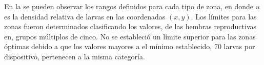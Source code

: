 En la  se pueden observar los rangos definidos para cada tipo de
zona, en donde $u$ es la densidad relativa de larvas en las coordenadas $(x, y)$. Los límites para
las zonas fueron determinados clasificando los valores, de las hembras reproductivas en, grupos
múltiplos de cinco. No se estableció un límite superior para las zonas óptimas debido a que los
valores mayores a el mínimo establecido, 70 larvas por dispositivo, pertenecen a la misma categoría.
